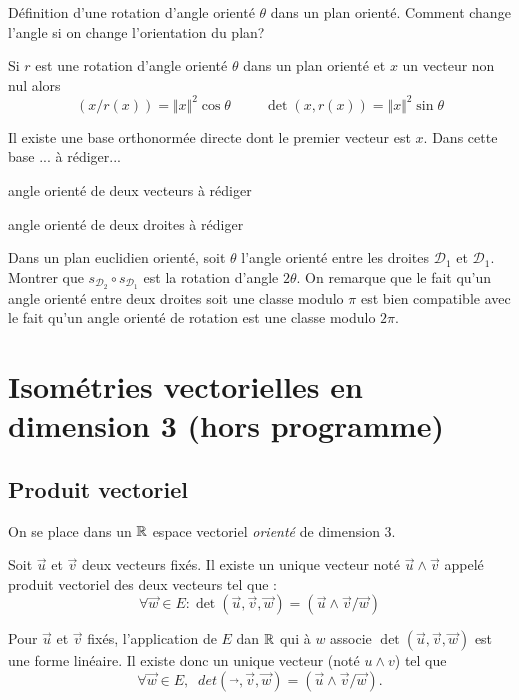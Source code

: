Définition d'une rotation d'angle orienté $\theta$ dans un plan orienté. Comment change l'angle si on change l'orientation du plan?
\clearpage
\begin{prop}
 Si $r$ est une rotation d'angle orienté $\theta$ dans un plan orienté et $x$ un vecteur non nul alors 
\begin{displaymath}
(x/r(x)) = \Vert x \Vert^2 \cos \theta \hspace{1cm} \det(x,r(x))= \Vert x\Vert^2 \sin \theta
\end{displaymath}
\end{prop}
\begin{demo}
Il existe une base orthonormée directe dont le premier vecteur est $x$. Dans cette base ...  à rédiger... 
\end{demo}

 
\begin{defi}
 angle orienté de deux vecteurs à rédiger
\end{defi}
\begin{defi}
 angle orienté de deux droites à rédiger
\end{defi}
Dans un plan euclidien orienté, soit $\theta$ l'angle orienté entre les droites $\mathcal{D}_1$ et $\mathcal{D}_1$. Montrer que $s_{\mathcal{D}_2}\circ s_{\mathcal{D}_1}$ est la rotation d'angle $2\theta$. On remarque que le fait qu'un angle orienté entre deux droites soit une classe modulo $\pi$ est bien compatible avec le fait qu'un angle orienté de rotation est une classe modulo $2\pi$.
\clearpage
\section{Isométries vectorielles en dimension 3 (hors programme)}
\subsection{Produit vectoriel}
On se place dans un $\mathbb{R}$ espace vectoriel \emph{orienté} de dimension $3$.
\begin{propn}
 Soit $\overrightarrow{u}$ et $\overrightarrow{v}$ deux vecteurs fixés. Il existe un unique vecteur noté $\overrightarrow{u} \wedge \overrightarrow{v}$ appelé produit vectoriel des deux vecteurs tel que :
\begin{displaymath}
 \forall \overrightarrow w \in E : \det(\overrightarrow u , \overrightarrow v , \overrightarrow w)
=  \left(  \overrightarrow u \wedge \overrightarrow v / \overrightarrow w \right) 
\end{displaymath}
\end{propn}
\begin{demo}
 Pour $\overrightarrow u$ et $\overrightarrow v$ fixés, l'application de $E$ dan $\mathbb{R}$ qui à $w$ associe $\det(\overrightarrow u,\overrightarrow v,\overrightarrow w)$ est une forme linéaire. Il existe donc un unique vecteur (noté $u\wedge v$) tel que 
 \[
  \forall \overrightarrow w \in E,\; \; det(\overrightarrow{},\overrightarrow v,\overrightarrow w) = (\overrightarrow u \wedge \overrightarrow v / \overrightarrow w).
 \]
\end{demo}

